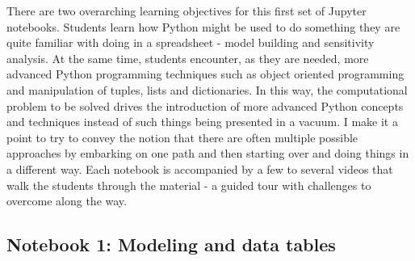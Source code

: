 \documentclass[ited,blindrev]{informs3}              %
\begin{document}
There are two overarching learning objectives for this first set of Jupyter notebooks. Students learn how Python might be used to do something they are quite familiar with doing in a spreadsheet - model building and sensitivity analysis. At the same time, students encounter, as they are needed, more advanced Python programming techniques such as object oriented programming and manipulation of tuples, lists and dictionaries. In this way, the computational problem to be solved drives the introduction of more advanced Python concepts and techniques instead of such things being presented in a vacuum. I make it a point to try to convey the notion that there are often multiple possible approaches by embarking on one path and then starting over and doing things in a different way. Each notebook is accompanied by a few to several videos that walk the students through the material - a guided tour with challenges to overcome along the way. 
 
 
\subsection{Notebook 1: Modeling and data tables}
\end{document}
